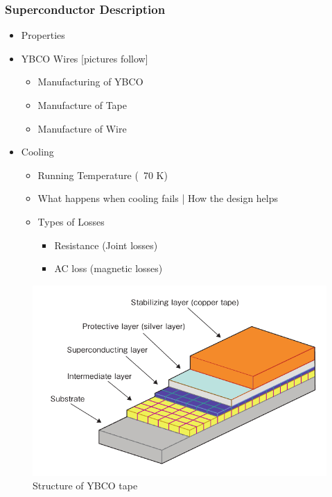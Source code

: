 \documentclass{beamer}
\begin{document}
		\begin{frame}
			\frametitle{Superconductor Description}
				\begin{itemize}
					\item Properties
					\item YBCO Wires [pictures follow]
						\begin{itemize}
							\item Manufacturing of YBCO
							\item Manufacture of Tape
							\item Manufacture of Wire
						\end{itemize}
					\item Cooling
						\begin{itemize}
							\item Running Temperature (~70 K)
							\item What happens when cooling fails | How the design helps
							\item Types of Losses
								\begin{itemize}
									\item Resistance (Joint losses)
									\item AC loss (magnetic losses)
								\end{itemize}
						\end{itemize}
				\end{itemize}
		\end{frame}

		\begin{frame}
			\begin{figure}
				\includegraphics[width=0.9\linewidth]{YBCO}
				\caption[Structure of YBCO tape]{Structure of YBCO tape}
			\end{figure}
		\end{frame}
\end{document}

